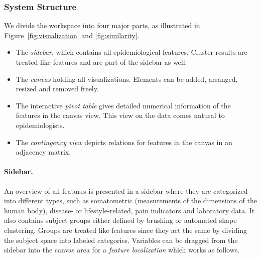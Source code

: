 \documentclass[journal]{style/vgtc} 			          %
\begin{document}
\subsubsection{System Structure} \label{Structure and Workflow}
We divide the workspace into four major parts, as illustrated in Figure~\ref{fig:visualization} and \ref{fig:similarity}.
\begin{itemize}
	\item The \emph{sidebar}, which contains all epidemiological features. Cluster results are treated like features and are part of the sidebar as well.
	\item The \emph{canvas} holding all visualizations. Elements can be added, arranged, resized and removed freely.
	\item The interactive \emph{pivot table} gives detailed numerical information of the features in the canvas view. This view on the data comes natural to epidemiologists.
	\item The \emph{contingency view} depicts relations for features in the canvas in an adjacency matrix.
\end{itemize}
%
% 
% 

\paragraph{Sidebar.}
An overview of all features is presented in a sidebar where they are categorized into different types, such as somatometric (measurements of the dimensions of the human body), disease- or lifestyle-related, pain indicators and laboratory data.
%
It also contains subject groups either defined by brushing or automated shape clustering.
%
Groups are treated like features since they act the same by dividing the subject space into labeled categories.
%
Variables can be dragged from the sidebar into the canvas area for a \emph{feature localization} which works as follows.
%
\end{document}
